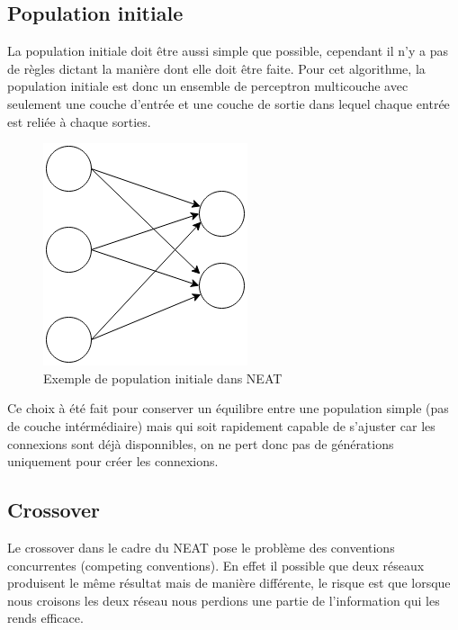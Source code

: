 \documentclass{article}
\begin{document}
\subsection{Population initiale}

La population initiale doit être aussi simple que possible, cependant il n'y a pas de règles dictant la manière dont elle doit être faite. Pour cet algorithme, la population initiale est donc un ensemble de perceptron multicouche avec seulement une couche d'entrée et une couche de sortie dans lequel chaque entrée est reliée à chaque sorties.

\begin{figure}[h]
\begin{center}
	\includegraphics[scale=0.6]{initneat.png}
	\caption{Exemple de population initiale dans NEAT}
\end{center}
\end{figure}

Ce choix à été fait pour conserver un équilibre entre une population simple (pas de couche intérmédiaire) mais qui soit rapidement capable de s'ajuster car les connexions sont déjà disponnibles, on ne pert donc pas de générations uniquement pour créer les connexions.

\subsection{Crossover}

Le crossover dans le cadre du NEAT pose le problème des conventions concurrentes (competing conventions). En effet il possible que deux réseaux produisent le même résultat mais de manière différente, le risque est que lorsque nous croisons les deux réseau nous perdions une partie de l'information qui les rends efficace.
\end{document}
